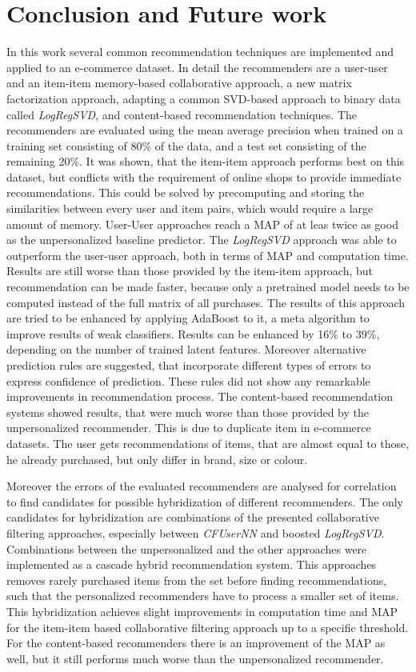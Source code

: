 \documentclass[10pt]{reportMaster}
\begin{document}
\chapter{Conclusion and Future work}
\label{chap:conclusionAndFutureWork}
In this work several common recommendation techniques are implemented and applied to an e-commerce dataset.
In detail the recommenders are a user-user and an item-item memory-based collaborative approach, a new matrix factorization approach, adapting a common SVD-based approach to binary data called \textit{LogRegSVD}, and content-based recommendation techniques.
The recommenders are evaluated using the mean average precision when trained on a training set consisting of 80\% of the data, and a test set consisting of the remaining 20\%.
It was shown, that the item-item approach performs best on this dataset, but conflicts with the requirement of online shops to provide immediate recommendations.
This could be solved by precomputing and storing the similarities between every user and item pairs, which would require a large amount of memory.
User-User approaches reach a MAP of at leas twice as good as the unpersonalized baseline predictor.
The \textit{LogRegSVD} approach was able to outperform the user-user approach, both in terms of MAP and computation time.
Results are still worse than those provided by the item-item approach, but recommendation can be made faster, because only a pretrained model needs to be computed instead of the full matrix of all purchases.
The results of this approach are tried to be enhanced by applying AdaBoost to it, a meta algorithm to improve results of weak classifiers.
Results can be enhanced by 16\% to 39\%, depending on the number of trained latent features.
Moreover alternative prediction rules are suggested, that incorporate different types of errors to express confidence of prediction.
These rules did not show any remarkable improvements in recommendation process.
The content-based recommendation systems showed results, that were much worse than those provided by the unpersonalized recommender.
This is due to duplicate item in e-commerce datasets.
The user gets recommendations of items, that are almost equal to those, he already purchased, but only differ in brand, size or colour.

Moreover the errors of the evaluated recommenders are analysed for correlation to find candidates for possible hybridization of different recommenders.
The only candidates for hybridization are combinations of the presented collaborative filtering approaches, especially between \textit{CFUserNN} and boosted \textit{LogRegSVD}.
Combinations between the unpersonalized and the other approaches were implemented as a cascade hybrid recommendation system.
This approaches removes rarely purchased items from the set before finding recommendations, such that the personalized recommenders have to process a smaller set of items.
This hybridization achieves slight improvements in computation time and MAP for the item-item based collaborative filtering approach up to a specific threshold.
For the content-based recommenders there is an improvement of the MAP as well, but it still performs much worse than the unpersonalized recommender.
\end{document}
